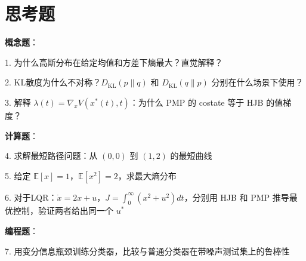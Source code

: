 \documentclass[12pt, a4paper]{ctexart}
\begin{document}
\section{思考题}

\begin{blackboard}[课后思考]

\textbf{概念题}：

1. 为什么高斯分布在给定均值和方差下熵最大？直觉解释？

2. KL散度为什么不对称？$D_{\text{KL}}(p\|q)$ 和 $D_{\text{KL}}(q\|p)$ 分别在什么场景下使用？

3. 解释 $\lambda(t) = \nabla_x V(x^*(t), t)$：为什么 PMP 的 costate 等于 HJB 的值梯度？

\textbf{计算题}：

4. 求解最短路径问题：从 $(0, 0)$ 到 $(1, 2)$ 的最短曲线

5. 给定 $\mathbb{E}[x] = 1$，$\mathbb{E}[x^2] = 2$，求最大熵分布

6. 对于LQR：$\dot{x} = 2x + u$，$J = \int_0^\infty (x^2 + u^2) dt$，分别用 HJB 和 PMP 推导最优控制，验证两者给出同一个 $u^*$

\textbf{编程题}：

7. 用变分信息瓶颈训练分类器，比较与普通分类器在带噪声测试集上的鲁棒性

\end{blackboard}
\end{document}

